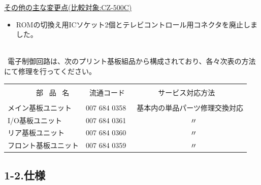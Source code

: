 ﻿\documentclass[twoside,a4paper,12pt]{article}
\begin{document}
\uline{その他の主な変更点(比較対象:CZ-500C)}

\begin{itemize}[leftmargin=25mm, itemsep=-1mm, topsep=1mm]
\item
ROMの切換え用ICソケット2個とテレビコントロール用コネクタを廃止しました。\\
\end{itemize}

\ \\[-3mm]

\scriptsize \ 電子制御回路は、次のプリント基板組品から構成されており、各々次表の方法にて修理を行ってください。\\[-2mm]

\small

\setlength{\arrayrulewidth}{0.5mm}
\setlength{\tabcolsep}{2mm}
\begin{tabular}{|p{55mm}|p{40mm}|p{62mm}|}
\hline
& & \\[-2mm]
\ \ \ \ \ \ \ \ 部 \ 品 \ 名 & \ 流通コード & \ \ \ \ \ \ \ サービス対応方法\\
\hline
& & \\[-4mm]
メイン基板ユニット & 007 684 0358 & \ 基本内の単品パーツ修理交換対応\\
I/O基板ユニット & 007 684 0361 & \ \ \ \ \ \ \ \ \ \ \ \ \ \ \ \ 〃\\
リア基板ユニット & 007 684 0360 & \ \ \ \ \ \ \ \ \ \ \ \ \ \ \ \ 〃\\
フロント基板ユニット & 007 684 0359 & \ \ \ \ \ \ \ \ \ \ \ \ \ \ \ \ 〃\\[4mm]
\hline
\end{tabular}

\newpage

\subsection*{1-2.仕様}
\end{document}
